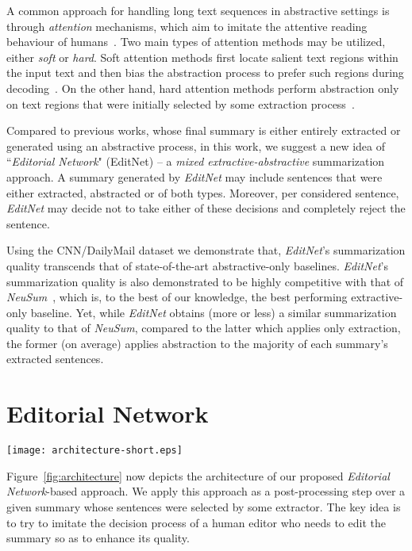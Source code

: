\documentclass{article}
\begin{document}
A common approach for handling long text sequences in abstractive settings is through \textit{attention} mechanisms, which aim to imitate the attentive reading behaviour of humans~\cite{Chopra2016Abs}.
Two main types of attention methods may be utilized, either \textit{soft} or \textit{hard}. Soft attention methods first locate salient text regions within the input text and then bias the abstraction process to prefer such regions during decoding~\cite{Cohan2018ADA,Gehrmann2018BottomUpAS,HsuAUM2018,DBLP:conf/conll/NallapatiZSGX16,Li2018KIGN,Pasunuru2018a,Tan2017a}. On the other hand, hard attention methods perform abstraction only on text regions that were initially selected by some extraction process~\cite{ChenFastAS2018,Nallapati2017a,liu2018a}.

Compared to previous works, whose final summary is either entirely extracted or generated using an abstractive process, in this work, we suggest a new idea of  ``\textit{Editorial Network}" (EditNet) -- a \textit{mixed extractive-abstractive} summarization approach.  A summary generated by \textit{EditNet} may include sentences that were either extracted, abstracted or of both types. Moreover, per considered sentence, \textit{EditNet} may decide not to take either of these decisions and completely reject the sentence. 

Using the CNN/DailyMail dataset we demonstrate that, \textit{EditNet}'s summarization quality transcends that of state-of-the-art abstractive-only baselines. \textit{EditNet}'s summarization quality is also demonstrated to be highly competitive with that of \textit{NeuSum}~\cite{Qingyu2018}, which is, to the best of our knowledge, the best performing extractive-only baseline. Yet, while \textit{EditNet} obtains (more or less) a similar summarization quality to that of \textit{NeuSum}, compared to the latter which applies only extraction, the former (on average) applies abstraction to the majority of each summary's extracted sentences.



\section{Editorial Network}
\begin{figure*}[t!]
  \centering
  \texttt{[image: architecture-short.eps]}
  \caption{Editorial Network}\label{fig:architecture}
\end{figure*}

Figure~\ref{fig:architecture} now depicts the architecture of our proposed \textit{Editorial Network}-based approach.
We apply this approach as a post-processing step over a given summary whose sentences were selected by some extractor. The key idea is to try to imitate the decision process of a human editor who needs to edit the summary so as to enhance its quality.
\end{document}
